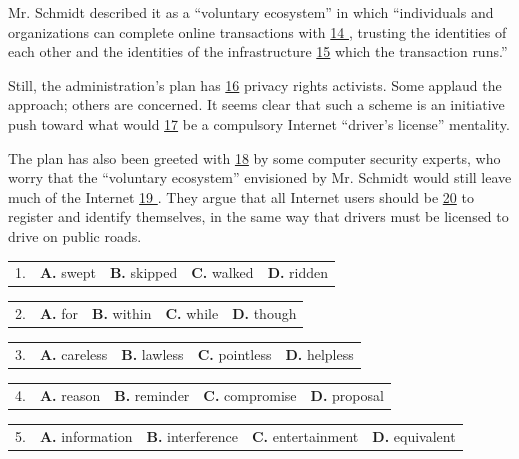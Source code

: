 \documentclass[UTF8,11pt]{ctexart}
\begin{document}
Mr. Schmidt described it as a “voluntary ecosystem” in which “individuals and organizations can complete online transactions with \uline{14 }, trusting the identities of each other and the identities of the infrastructure \uline{15} which the transaction runs.”


Still, the administration’s plan has \uline{16} privacy rights activists. Some applaud the approach; others are concerned. It seems clear that such a scheme is an initiative push toward what would \uline{17} be a compulsory Internet “driver’s license” mentality.


The plan has also been greeted with \uline{18} by some computer security experts, who worry that the “voluntary ecosystem” envisioned by Mr. Schmidt would still leave much of the Internet \uline{19 }. They argue that all Internet users should be \uline{20} to register and identify themselves, in the same way that drivers must be licensed to drive on public roads.


\noindent\begin{tabularx}{\linewidth}{@{}lXXXX@{}}1. & \textbf{A.} swept & \textbf{B.} skipped & \textbf{C.} walked & \textbf{D.} ridden\\\end{tabularx}\par

\noindent\begin{tabularx}{\linewidth}{@{}lXXXX@{}}2. & \textbf{A.} for & \textbf{B.} within & \textbf{C.} while & \textbf{D.} though\\\end{tabularx}\par

\noindent\begin{tabularx}{\linewidth}{@{}lXXXX@{}}3. & \textbf{A.} careless & \textbf{B.} lawless & \textbf{C.} pointless & \textbf{D.} helpless\\\end{tabularx}\par

\noindent\begin{tabularx}{\linewidth}{@{}lXXXX@{}}4. & \textbf{A.} reason & \textbf{B.} reminder & \textbf{C.} compromise & \textbf{D.} proposal\\\end{tabularx}\par

\noindent\begin{tabularx}{\linewidth}{@{}lXXXX@{}}5. & \textbf{A.} information & \textbf{B.} interference & \textbf{C.} entertainment & \textbf{D.} equivalent\\\end{tabularx}\par
\end{document}

